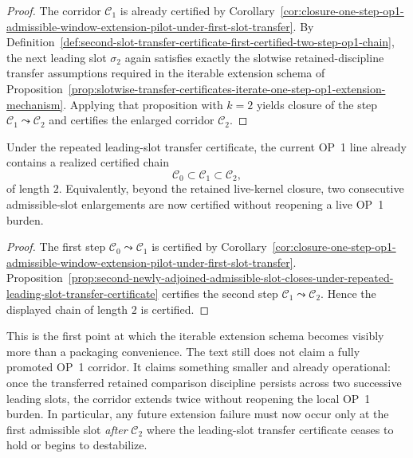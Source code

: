 \begin{proof}
The corridor $\mathcal C_1$ is already certified by Corollary~\ref{cor:closure-one-step-op1-admissible-window-extension-pilot-under-first-slot-transfer}. By Definition~\ref{def:second-slot-transfer-certificate-first-certified-two-step-op1-chain}, the next leading slot $\sigma_2$ again satisfies exactly the slotwise retained-discipline transfer assumptions required in the iterable extension schema of Proposition~\ref{prop:slotwise-transfer-certificates-iterate-one-step-op1-extension-mechanism}. Applying that proposition with $k=2$ yields closure of the step $\mathcal C_1\leadsto \mathcal C_2$ and certifies the enlarged corridor $\mathcal C_2$.
\end{proof}

\begin{corollary}
\label{cor:first-realized-certified-two-slot-op1-admissible-window-chain}
Under the repeated leading-slot transfer certificate, the current OP~1 line already contains a realized certified chain
\[
 \mathcal C_0\subset \mathcal C_1\subset \mathcal C_2,
\]
of length $2$. Equivalently, beyond the retained live-kernel closure, two consecutive admissible-slot enlargements are now certified without reopening a live OP~1 burden.
\end{corollary}

\begin{proof}
The first step $\mathcal C_0\leadsto \mathcal C_1$ is certified by Corollary~\ref{cor:closure-one-step-op1-admissible-window-extension-pilot-under-first-slot-transfer}. Proposition~\ref{prop:second-newly-adjoined-admissible-slot-closes-under-repeated-leading-slot-transfer-certificate} certifies the second step $\mathcal C_1\leadsto \mathcal C_2$. Hence the displayed chain of length $2$ is certified.
\end{proof}

\begin{remark}
\label{rem:what-first-realized-two-slot-chain-now-buys}
This is the first point at which the iterable extension schema becomes visibly more than a packaging convenience. The text still does not claim a fully promoted OP~1 corridor. It claims something smaller and already operational: once the transferred retained comparison discipline persists across two successive leading slots, the corridor extends twice without reopening the local OP~1 burden. In particular, any future extension failure must now occur only at the first admissible slot \emph{after} $\mathcal C_2$ where the leading-slot transfer certificate ceases to hold or begins to destabilize.
\end{remark}



